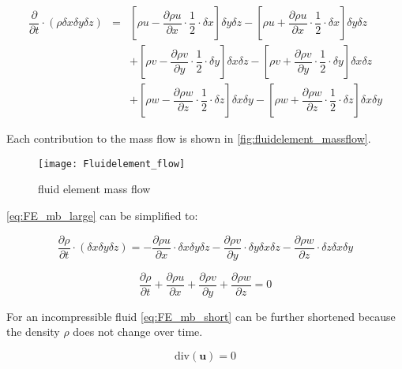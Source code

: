 \documentclass[../thesis.tex]{subfiles}
\begin{document}
\begin{eqnarray}
	\label{eq:FE_mb_large}
	\dfrac{\partial}{\partial t} \cdot (\rho \delta x \delta y \delta z) & = & \left[ \rho u -  \dfrac{\partial \rho u}{\partial x} \cdot \dfrac{1}{2} \cdot \delta x \right] \delta y \delta z -
	\left[ \rho u +  \dfrac{\partial \rho u}{\partial x} \cdot \dfrac{1}{2} \cdot \delta x \right] \delta y \delta z \nonumber \\
	& & + \left[ \rho v -  \dfrac{\partial \rho v}{\partial y} \cdot \dfrac{1}{2} \cdot \delta y \right] \delta x \delta z -
	\left[ \rho v +  \dfrac{\partial \rho v}{\partial y} \cdot \dfrac{1}{2} \cdot \delta y \right] \delta x \delta z \\
	& & + \left[ \rho w -  \dfrac{\partial \rho w}{\partial z} \cdot \dfrac{1}{2} \cdot \delta z \right] \delta x\delta y -
	\left[ \rho w +  \dfrac{\partial \rho w}{\partial z} \cdot \dfrac{1}{2} \cdot \delta z \right] \delta x \delta y \nonumber
\end{eqnarray}

Each contribution to the mass flow is shown in \autoref{fig:fluidelement_massflow}.

\begin{figure}[htbp]
	\centering
	\texttt{[image: Fluidelement\_flow]}
	\caption{fluid element mass flow}
	\label{fig:fluidelement_massflow}
\end{figure}

\autoref{eq:FE_mb_large} can be simplified to:

\begin{equation}
	\dfrac{\partial \rho}{\partial t} \cdot (\delta x \delta y \delta z) = - \dfrac{\partial \rho u}{\partial x} \cdot \delta x \delta y \delta z - \dfrac{\partial \rho v}{\partial y} \cdot \delta y \delta x \delta z - \dfrac{\partial \rho w}{\partial z} \cdot \delta z \delta x \delta y
\end{equation}

\begin{equation}
	\label{eq:FE_mb_short}
	\dfrac{\partial \rho}{\partial t} + \dfrac{\partial \rho u}{\partial x} + \dfrac{\partial \rho v}{\partial y} + \dfrac{\partial \rho w}{\partial z} = 0
\end{equation}

For an incompressible fluid \autoref{eq:FE_mb_short} can be further shortened because the density $ \rho $ does not change over time.

\begin{equation}
	\mathrm{div}(\textbf{u}) = 0
\end{equation}
\end{document}
